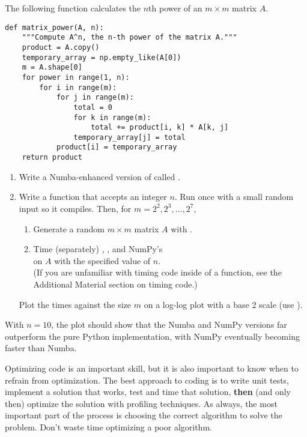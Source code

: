 \begin{problem} %
The following function calculates the $n$th power of an $m\times m$ matrix $A$.

\begin{lstlisting}
def matrix_power(A, n):
    """Compute A^n, the n-th power of the matrix A."""
    product = A.copy()
    temporary_array = np.empty_like(A[0])
    m = A.shape[0]
    for power in range(1, n):
        for i in range(m):
            for j in range(m):
                total = 0
                for k in range(m):
                    total += product[i, k] * A[k, j]
                temporary_array[j] = total
            product[i] = temporary_array
    return product
\end{lstlisting}

\begin{enumerate}
\item Write a Numba-enhanced version of  called .
\item Write a function that accepts an integer $n$.
Run  once with a small random input so it compiles.
Then, for $m=2^2,2^3,\ldots,2^7$,
    \begin{enumerate}
        \item Generate a random $m\times m$ matrix $A$ with .
        \item Time (separately) , , and NumPy's \\  on $A$ with the specified value of $n$.
        \\(If you are unfamiliar with timing code inside of a function, see the \\ Additional Material section on timing code.)
    \end{enumerate}
Plot the times against the size $m$ on a log-log plot with a base 2 scale (use ).
\end{enumerate}
With $n=10$, the plot should show that the Numba and NumPy versions far outperform the pure Python implementation, with NumPy eventually becoming faster than Numba.
\end{problem}

\begin{warn}
Optimizing code is an important skill, but it is also important to know when to refrain from optimization.
The best approach to coding is to write unit tests, implement a solution that works, test and time that solution, \textbf{then} (and only then) optimize the solution with profiling techniques.
As always, the most important part of the process is choosing the correct algorithm to solve the problem.
Don't waste time optimizing a poor algorithm.
\end{warn}

